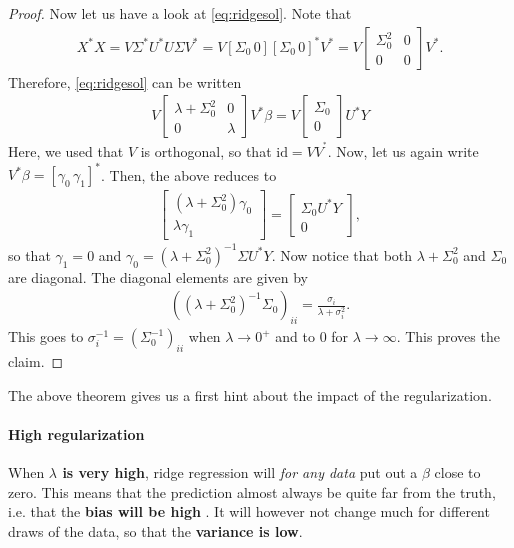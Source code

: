 \documentclass{article}
\newcommand{\id}{\mathrm{id}}
\begin{document}
\begin{proof}
    Now let us have a look at \eqref{eq:ridgesol}. Note that 
\begin{align*}
    X^*X = V\Sigma^*U^*U \Sigma V^* = V  [\Sigma_0 \, 0] [\Sigma_0 \, 0]^* V^* = V\begin{bmatrix} \Sigma_0^2 & 0 \\ 0 & 0 \end{bmatrix} V^*.
\end{align*}
Therefore,  \eqref{eq:ridgesol} can be written
\begin{align*}
    V\begin{bmatrix} \lambda + \Sigma_0^2 & 0 \\ 0 & \lambda \end{bmatrix} V^*\beta = V\begin{bmatrix} \Sigma_0 \\ 0 \end{bmatrix} U^*Y
\end{align*}
Here, we used that $V$ is orthogonal, so that $\id = VV^^*$. Now, let us again write $V^* \beta = [\gamma_0 \, \gamma_1]^*$. Then, the above reduces to 
    \begin{align*}
        \begin{bmatrix} (\lambda + \Sigma_0^2) \gamma_0 \\ \lambda \gamma_1 \end{bmatrix} = \begin{bmatrix}
            \Sigma_0 U^*Y \\ 0 
        \end{bmatrix},
    \end{align*} 
    so that $\gamma_1 = 0$ and $\gamma_0 = (\lambda + \Sigma_0^2)^{-1}\Sigma U^*Y$. Now notice that both $\lambda + \Sigma_0^2$ and $\Sigma_0$ are diagonal. The diagonal elements are given by
    \begin{align*}
        ((\lambda + \Sigma_0^2)^{-1}\Sigma_0)_{ii} = \frac{\sigma_i}{\lambda +\sigma_i^2}.
    \end{align*}
    This goes to $\sigma_i^{-1}=(\Sigma_0^{-1})_{ii}$ when $\lambda\to 0^+$ and to $0$ for $\lambda \to \infty$. This proves the claim.

\end{proof}

The above theorem gives us a first hint about the impact of the regularization. 

\paragraph{High regularization} When  \textbf{$\lambda$ is very high}, ridge regression will \emph{for any data} put out a $\beta$ close to zero. This means that the prediction almost always be quite far from the truth, i.e. that the \textbf{bias will be high} . It will however not change much for different draws of the data, so that the \textbf{variance is low}. 
\end{document}
